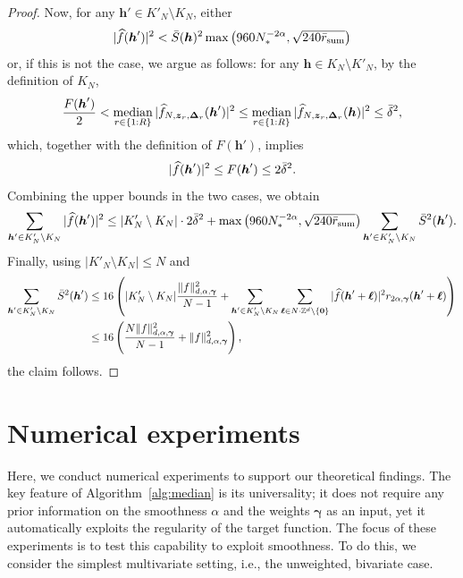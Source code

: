 \documentclass[a4paper,11pt]{article}
\newcommand{\bszero}{\boldsymbol{0}}
\newcommand{\bsh}{\boldsymbol{h}}
\newcommand{\bsl}{\boldsymbol{\ell}}
\newcommand{\bsz}{\boldsymbol{z}}
\newcommand{\bsgamma}{\boldsymbol{\gamma}}
\newcommand{\bsDelta}{\boldsymbol{\Delta}}
\newcommand{\ZZ}{\mathbb{Z}}
\begin{document}
\begin{proof}
    Now, for any $\bsh'\in K'_N\setminus K_N$, either
    \[
    |\widehat{f}(\bsh')|^2< \Bar{S}(\bsh)^2\max\left(960 N^{-2\alpha}_*,\sqrt{240 \Bar{r}_{\mathrm{sum}} }\right)
    \]
    or, if this is not the case, we argue as follows: for any $\bsh\in K_N\setminus K'_N$, by the definition of $K_N$,
    \[
    \frac{F(\bsh')}{2} <
    \operatorname*{median}_{r\in\{1{:}R\}}| \widehat{f}_{N,\bsz_r,\bsDelta_r}(\bsh')|^2 \le \operatorname*{median}_{r\in\{1{:}R\}}| \widehat{f}_{N,\bsz_r,\bsDelta_r}(\bsh)|^2\leq \Bar{\delta}^2,
    \]
    which, together with the definition of $F(\bsh')$, implies
    \[
    |\widehat{f}(\bsh')|^2\leq F(\bsh')\leq 2\Bar{\delta}^2.
    \]
    Combining the upper bounds in the two cases, we obtain
    \[
        \sum_{\bsh'\in K'_N\setminus K_N}|\widehat{f}(\bsh')|^2
        \leq |K'_N\setminus K_N|\cdot 2\Bar{\delta}^2
        + \max\left(960 N^{-2\alpha}_*,\sqrt{240 \Bar{r}_{\mathrm{sum}} }\right)\sum_{\bsh'\in K'_N\setminus K_N} \Bar{S}^2(\bsh').
    \]
    Finally, using $|K'_N\setminus K_N|\le N$ and 
    \begin{align*}
    \sum_{\bsh'\in K'_N\setminus K_N} \Bar{S}^2(\bsh')
    & \leq 16\left(|K'_N\setminus K_N|\frac{\|f\|^2_{d,\alpha,\bsgamma}}{N-1 }+\sum_{\bsh'\in K'_N\setminus K_N}\sum_{\bsl \in N\cdot \ZZ^d\setminus \{\bszero\} }|\widehat{f}(\bsh'+\bsl)|^2r_{2\alpha, \bsgamma}(\bsh'+\bsl)\right)\\
    & \leq 16 \left( \frac{N\|f\|^2_{d,\alpha,\bsgamma}}{N-1 }+\|f\|^2_{d,\alpha,\bsgamma}\right),
    \end{align*}
    the claim follows.
\end{proof}

\section{Numerical experiments}\label{sec:experiment}
Here, we conduct numerical experiments to support our theoretical findings. The key feature of Algorithm~\ref{alg:median} is its universality; it does not require any prior information on the smoothness $\alpha$ and the weights $\bsgamma$ as an input, yet it automatically exploits the regularity of the target function. The focus of these experiments is to test this capability to exploit smoothness. To do this, we consider the simplest multivariate setting, i.e., the unweighted, bivariate case.
\end{document}
